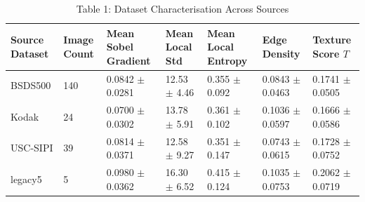\begin{table}[htbp]
\centering
\caption{Table 1: Dataset Characterisation Across Sources}
\begin{tabular}{lllllll}
\toprule
Source Dataset & Image Count & Mean Sobel Gradient & Mean Local Std & Mean Local Entropy & Edge Density & Texture Score $T$ \\
\midrule
BSDS500 & 140 & 0.0842 $\pm$ 0.0281 & 12.53 $\pm$ 4.46 & 0.355 $\pm$ 0.092 & 0.0843 $\pm$ 0.0463 & 0.1741 $\pm$ 0.0505 \\
Kodak & 24 & 0.0700 $\pm$ 0.0302 & 13.78 $\pm$ 5.91 & 0.361 $\pm$ 0.102 & 0.1036 $\pm$ 0.0597 & 0.1666 $\pm$ 0.0586 \\
USC-SIPI & 39 & 0.0814 $\pm$ 0.0371 & 12.58 $\pm$ 9.27 & 0.351 $\pm$ 0.147 & 0.0743 $\pm$ 0.0615 & 0.1728 $\pm$ 0.0752 \\
legacy5 & 5 & 0.0980 $\pm$ 0.0362 & 16.30 $\pm$ 6.52 & 0.415 $\pm$ 0.124 & 0.1035 $\pm$ 0.0753 & 0.2062 $\pm$ 0.0719 \\
\bottomrule
\end{tabular}
\end{table}
